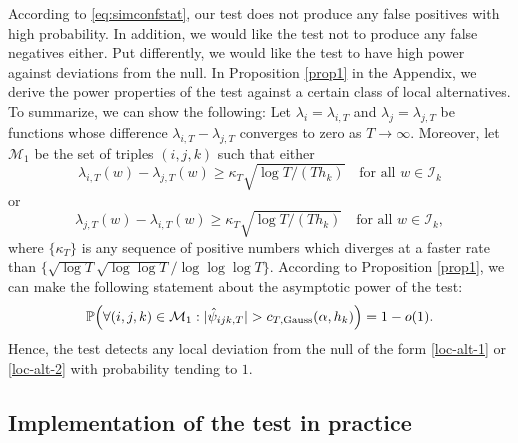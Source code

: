 \documentclass[a4paper,12pt]{article}
\numberwithin{equation}{section}
\begin{document}
{According to \eqref{eq:simconfstat}, our test does not produce any false positives with high probability. In addition, we would like the test not to produce any false negatives either. Put differently, we would like the test to have high power against deviations from the null. 
In Proposition \ref{prop1} in the Appendix, we derive the power properties of the test against a certain class of local alternatives. To summarize, we can show the following: Let $\lambda_{i}= \lambda_{i, T}$ and $\lambda_j =\lambda_{j, T}$ be functions whose difference $\lambda_{i,T} - \lambda_{j,T}$ converges to zero as $T \to \infty$. Moreover, let $\mathcal{M}_1$ be the set of triples $(i,j,k)$ such that either
\begin{equation}\label{loc-alt-1}
\lambda_{i, T}(w) - \lambda_{j, T}(w) \ge \kappa_T \sqrt{\log T / (T h_{k})} \quad \text{for all } w \in \mathcal{I}_{k} 
\end{equation}
or 
\begin{equation}\label{loc-alt-2}
\lambda_{j, T}(w) - \lambda_{i, T}(w) \ge \kappa_T \sqrt{\log T / (T h_{k})} \quad \text{for all } w \in \mathcal{I}_{k}, 
\end{equation}
where $\{\kappa_T\}$ is any sequence of positive numbers which diverges at a faster rate than $\{ \sqrt{\log T} \sqrt{\log \log T} / \log \log \log T \}$. According to Proposition \ref{prop1}, we can make the following statement about the asymptotic power of the test:
\begin{equation}\label{eq:power}
\mathbb{P}\Big( \forall (i,j,k) \in \mathcal{M}_1: |\hat{\psi}_{ijk,T}| > c_{T,\textnormal{Gauss}}(\alpha,h_k) \Big) = 1 - o(1).
\end{equation}
Hence, the test detects any local deviation from the null of the form \eqref{loc-alt-1} or \eqref{loc-alt-2} with probability tending to $1$. 
}


\subsection{Implementation of the test in practice}
\end{document}
